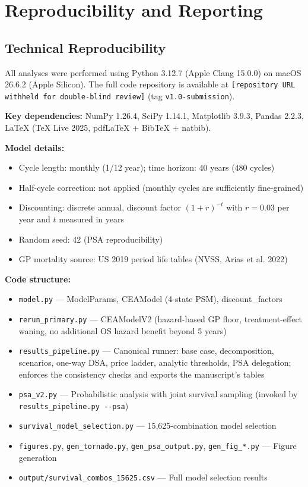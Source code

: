 \documentclass[11pt,a4paper]{article}
\begin{document}
\section{Reproducibility and Reporting}

\subsection{Technical Reproducibility}
\label{sec:tech_repro}
All analyses were performed using Python 3.12.7 (Apple Clang 15.0.0) on macOS 26.6.2 (Apple Silicon). The full code repository is available at \texttt{[repository URL withheld for double-blind review]} (tag \texttt{v1.0-submission}).

\textbf{Key dependencies:} NumPy 1.26.4, SciPy 1.14.1, Matplotlib 3.9.3, Pandas 2.2.3, LaTeX (TeX Live 2025, pdfLaTeX + BibTeX + natbib).

\textbf{Model details:}
\begin{itemize}
    \item Cycle length: monthly (1/12 year); time horizon: 40 years (480 cycles)
    \item Half-cycle correction: not applied (monthly cycles are sufficiently fine-grained)
    \item Discounting: discrete annual, discount factor $(1+r)^{-t}$ with $r = 0.03$ per year and $t$ measured in years
    \item Random seed: 42 (PSA reproducibility)
    \item GP mortality source: US 2019 period life tables (NVSS, Arias et al. 2022)
\end{itemize}

\textbf{Code structure:}
\begin{itemize}
    \item \texttt{model.py} --- ModelParams, CEAModel (4-state PSM), discount\_factors
    \item \texttt{rerun\_primary.py} --- CEAModelV2 (hazard-based GP floor, treatment-effect waning, no additional OS hazard benefit beyond 5 years)
    \item \texttt{results\_pipeline.py} --- Canonical runner: base case, decomposition, scenarios, one-way DSA, price ladder, analytic thresholds, PSA delegation; enforces the consistency checks and exports the manuscript's tables
    \item \texttt{psa\_v2.py} --- Probabilistic analysis with joint survival sampling (invoked by \texttt{results\_pipeline.py -{}-psa})
    \item \texttt{survival\_model\_selection.py} --- 15,625-combination model selection
    \item \texttt{figures.py}, \texttt{gen\_tornado.py}, \texttt{gen\_psa\_output.py}, \texttt{gen\_fig\_*.py} --- Figure generation
    \item \texttt{output/survival\_combos\_15625.csv} --- Full model selection results
\end{itemize}
\end{document}
